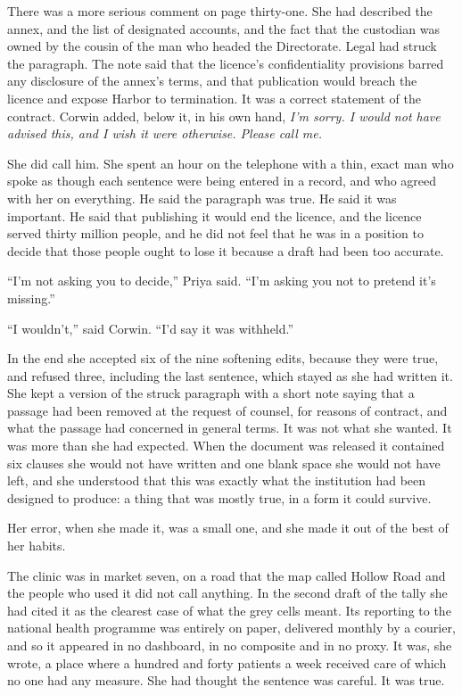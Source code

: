 There was a more serious comment on page thirty-one. She had described the annex, and the list of designated accounts, and the fact that the custodian was owned by the cousin of the man who headed the Directorate. Legal had struck the paragraph. The note said that the licence's confidentiality provisions barred any disclosure of the annex's terms, and that publication would breach the licence and expose Harbor to termination. It was a correct statement of the contract. Corwin added, below it, in his own hand, \emph{I'm sorry. I would not have advised this, and I wish it were otherwise. Please call me.}

She did call him. She spent an hour on the telephone with a thin, exact man who spoke as though each sentence were being entered in a record, and who agreed with her on everything. He said the paragraph was true. He said it was important. He said that publishing it would end the licence, and the licence served thirty million people, and he did not feel that he was in a position to decide that those people ought to lose it because a draft had been too accurate.

``I'm not asking you to decide,'' Priya said. ``I'm asking you not to pretend it's missing.''

``I wouldn't,'' said Corwin. ``I'd say it was withheld.''

In the end she accepted six of the nine softening edits, because they were true, and refused three, including the last sentence, which stayed as she had written it. She kept a version of the struck paragraph with a short note saying that a passage had been removed at the request of counsel, for reasons of contract, and what the passage had concerned in general terms. It was not what she wanted. It was more than she had expected. When the document was released it contained six clauses she would not have written and one blank space she would not have left, and she understood that this was exactly what the institution had been designed to produce: a thing that was mostly true, in a form it could survive.

\scenebreak
\noindent Her error, when she made it, was a small one, and she made it out of the best of her habits.

The clinic was in market seven, on a road that the map called Hollow Road and the people who used it did not call anything. In the second draft of the tally she had cited it as the clearest case of what the grey cells meant. Its reporting to the national health programme was entirely on paper, delivered monthly by a courier, and so it appeared in no dashboard, in no composite and in no proxy. It was, she wrote, a place where a hundred and forty patients a week received care of which no one had any measure. She had thought the sentence was careful. It was true.

